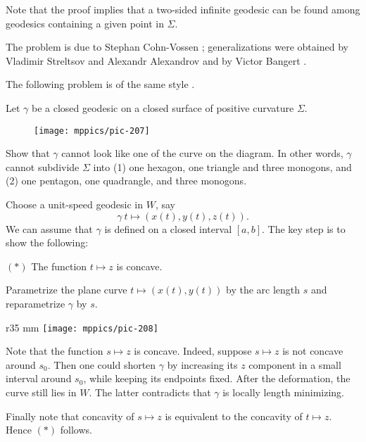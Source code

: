 Note that the proof implies that a two-sided infinite geodesic can be found among geodesics containing a given point in $\Sigma$.

The problem is due to Stephan Cohn-Vossen \cite[Satz 9 in][]{convossen};
generalizations were obtained  by 
Vladimir Streltsov and Alexandr Alexandrov 
\cite{streltsov-alexandrov} 
and 
by Victor Bangert \cite{bangert}.

The following problem is of the same style \cite{petrunin-self-crossing-geodesics}.

\begin{pr}
Let $\gamma$ be a closed geodesic on a closed surface of positive curvature $\Sigma$.
\begin{figure}[ht!]
\vskip-0mm
\centering
\texttt{[image: mppics/pic-207]}
\end{figure}
Show that $\gamma$ cannot look like one of the curve on the diagram.
In other words, $\gamma$ cannot subdivide $\Sigma$ into (1) one hexagon, one triangle and three monogons, and (2) one pentagon, one quadrangle, and three monogons.
\end{pr}



Choose a unit-speed geodesic in $W$, say
\[\gamma\:t\mapsto(x(t),y(t),z(t)).\]
We can assume that $\gamma$ is defined on a closed interval $[a,b]$.
The key step is to show the following:

\begin{cl}{$({*})$} 
The function $t\mapsto z$ is concave.
\end{cl}


Parametrize the plane curve $t\mapsto (x(t),y(t))$ by the arc length $s$
and reparametrize $\gamma$ by $s$.

\begin{wrapfigure}{r}{35 mm}
\vskip-4mm
\centering
\texttt{[image: mppics/pic-208]}
\end{wrapfigure}

Note that the function $s\mapsto z$ is concave.
Indeed, suppose $s\mapsto z$ is not concave around $s_0$.
Then one could shorten $\gamma$ by increasing its $z$ component in a small interval around $s_0$, while keeping its endpoints fixed.
After the deformation, the curve still lies in $W$.
The latter contradicts that $\gamma$ is locally length minimizing.

Finally note that concavity of $s\mapsto z$ is equivalent to the concavity of $t\mapsto z$.
Hence $({*})$ follows.



